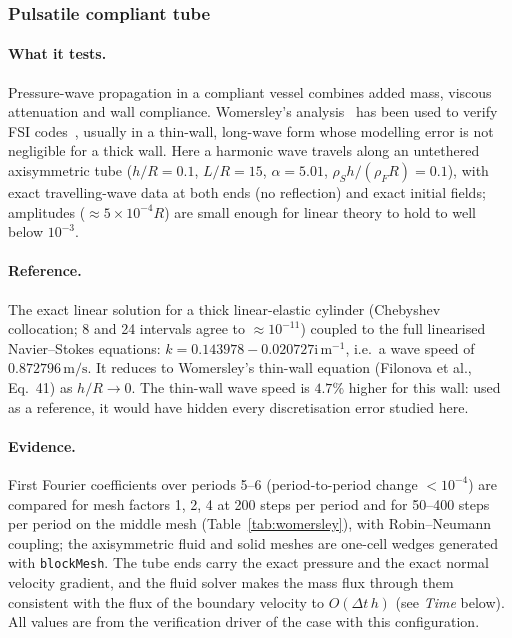 \subsubsection{Pulsatile compliant tube}\label{sec:womersley}

\paragraph{What it tests.}
Pressure-wave propagation in a compliant vessel combines added mass, viscous attenuation and wall compliance.
Womersley's analysis~\citep{Womersley1955, Womersley1957} has been used to verify FSI codes~\citep{Filonova2020, Hessenthaler2020}, usually in a thin-wall, long-wave form whose modelling error is not negligible for a thick wall.
Here a harmonic wave travels along an untethered axisymmetric tube ($h/R = 0.1$, $L/R = 15$, $\alpha = 5.01$, $\rho_S h/(\rho_F R) = 0.1$), with exact travelling-wave data at both ends (no reflection) and exact initial fields; amplitudes ($\approx5\times10^{-4}R$) are small enough for linear theory to hold to well below $10^{-3}$.

\paragraph{Reference.}
The exact linear solution for a thick linear-elastic cylinder (Chebyshev collocation; 8 and 24 intervals agree to $\approx10^{-11}$) coupled to the full linearised Navier--Stokes equations: $k = 0.143978 - 0.020727\mathrm{i}\,\mathrm{m^{-1}}$, i.e.\ a wave speed of $0.872796\,\mathrm{m/s}$.
It reduces to Womersley's thin-wall equation (Filonova et al., Eq.~41) as $h/R\to0$.
The thin-wall wave speed is $4.7\%$ higher for this wall: used as a reference, it would have hidden every discretisation error studied here.

\paragraph{Evidence.}
First Fourier coefficients over periods 5--6 (period-to-period change $<10^{-4}$) are compared for mesh factors 1, 2, 4 at 200 steps per period and for 50--400 steps per period on the middle mesh (Table~\ref{tab:womersley}), with Robin--Neumann coupling; the axisymmetric fluid and solid meshes are one-cell wedges generated with \texttt{blockMesh}.
The tube ends carry the exact pressure and the exact normal velocity gradient, and the fluid solver makes the mass flux through them consistent with the flux of the boundary velocity to $O(\Delta t\,h)$ (see \emph{Time} below). All values are from the verification driver of the case with this configuration.

